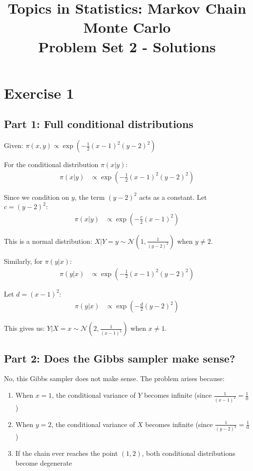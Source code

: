 \documentclass[11pt,a4paper]{article}
\title{Topics in Statistics: Markov Chain Monte Carlo\\Problem Set 2 - Solutions}
\author{}
\date{}
\begin{document}
\maketitle

\section{Exercise 1}

\subsection{Part 1: Full conditional distributions}

Given: $\pi(x, y) \propto \exp\left(-\frac{1}{2}(x - 1)^2(y - 2)^2\right)$

For the conditional distribution $\pi(x|y)$:
\begin{align}
\pi(x|y) &\propto \exp\left(-\frac{1}{2}(x - 1)^2(y - 2)^2\right)
\end{align}

Since we condition on $y$, the term $(y - 2)^2$ acts as a constant. Let $c = (y - 2)^2$:
\begin{align}
\pi(x|y) &\propto \exp\left(-\frac{c}{2}(x - 1)^2\right)
\end{align}

This is a normal distribution: $X|Y=y \sim \mathcal{N}\left(1, \frac{1}{(y-2)^2}\right)$ when $y \neq 2$.

Similarly, for $\pi(y|x)$:
\begin{align}
\pi(y|x) &\propto \exp\left(-\frac{1}{2}(x - 1)^2(y - 2)^2\right)
\end{align}

Let $d = (x - 1)^2$:
\begin{align}
\pi(y|x) &\propto \exp\left(-\frac{d}{2}(y - 2)^2\right)
\end{align}

This gives us: $Y|X=x \sim \mathcal{N}\left(2, \frac{1}{(x-1)^2}\right)$ when $x \neq 1$.

\subsection{Part 2: Does the Gibbs sampler make sense?}

No, this Gibbs sampler does not make sense. The problem arises because:

\begin{enumerate}
\item When $x = 1$, the conditional variance of $Y$ becomes infinite (since $\frac{1}{(x-1)^2} = \frac{1}{0}$)
\item When $y = 2$, the conditional variance of $X$ becomes infinite (since $\frac{1}{(y-2)^2} = \frac{1}{0}$)
\item If the chain ever reaches the point $(1, 2)$, both conditional distributions become degenerate
\end{enumerate}
\end{document}
